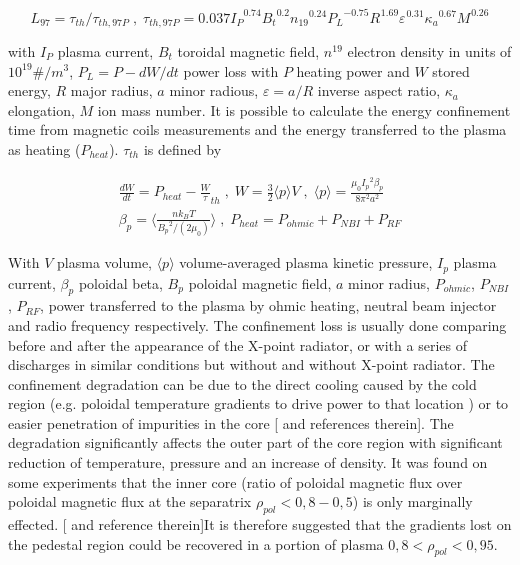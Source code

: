 \begin{equation}
{ L }_{ 97 }={\tau }_{ th }/{\tau }_{ th,97P } \; , \; {\tau }_{ th,97P }=0.037 {{ I }_{ P }}^{ 0.74} {{ B }_{ t }}^{ 0.2} {{ n }_{ 19 }}^{ 0.24} {{ P }_{ L }}^{ -0.75} {{ R }_{  }}^{ 1.69} {{ \varepsilon  }_{  }}^{ 0.31} {{ \kappa  }_{ a }}^{ 0.67} {{ M }_{  }}^{ 0.26}
\label{eq:l97}
\end{equation}

with $I_P$ plasma current, $B_t$ toroidal magnetic field, $n^{19}$ electron density in units of $10^{19} \#/m^3$, $P_L=P-dW/dt$ power loss with $P$ heating power and $W$ stored energy, $R$ major radius, $a$ minor radious, $\varepsilon=a/R$ inverse aspect ratio, $\kappa _a$ elongation, $M$ ion mass number.
It is possible to calculate the energy confinement time from magnetic coils measurements and the energy transferred to the plasma as heating ($P_{heat}$). $\tau_{th}$ is defined by 

\begin{equation}
\begin{split}
\frac {dW} {dt}={P}_{heat} - \frac {W} {\tau }_{ th } \; , \; W=\frac { 3} {2} \langle p \rangle V \; , \; \langle p \rangle = \frac {{ \mu }_{ 0 } {{ I }_{ p }}^{ 2 } { \beta }_{ p }} { 8 {\pi}^{2} {a}^{2}  } \\ {\beta }_{ p } = \langle \frac { n {k}_{B} T} { {{B}_{p}}^{2} /(2 {\mu}_{0}) } \rangle \; , \; {P }_{ heat }={ P }_{ ohmic }+{ P }_{ NBI }+{ P }_{ RF }
\label{eq:tau}
\end{split}
\end{equation}


With $V$ plasma volume, $\langle p \rangle$ volume-averaged plasma kinetic pressure, $I_p$ plasma current, ${{ \beta }_{ p }}$ poloidal beta, $B_p$ poloidal magnetic field, $a$ minor radius, $P_{ohmic}$, $P_{NBI}$, $P_{RF}$, power transferred to the plasma by ohmic heating, neutral beam injector and radio frequency respectively. \cite{SalarElahi2010,Fallis2013} The confinement loss is usually done comparing before and after the appearance of the X-point radiator, or with a series of discharges in similar conditions but without and without X-point radiator.
The confinement degradation can be due to the direct cooling caused by the cold region (e.g. poloidal temperature gradients to drive power to that location \cite{Lipschultz1998} ) or to easier penetration of impurities in the core [\cite{Lipschultz2016} and references therein]. The degradation significantly affects the outer part of the core region with significant reduction of temperature, pressure and an increase of density. \cite{Kallenbach2015a}  It was found on some experiments that the inner core (ratio of poloidal magnetic flux over poloidal magnetic flux at the separatrix $ \rho _{pol}<0,8-0,5 $) is only marginally effected. [\cite{Reinke2013} and reference therein]It is therefore suggested that the gradients lost on the pedestal region could be recovered in a portion of plasma $0,8< \rho _{pol}<0,95$. \cite{Reimold2015}

